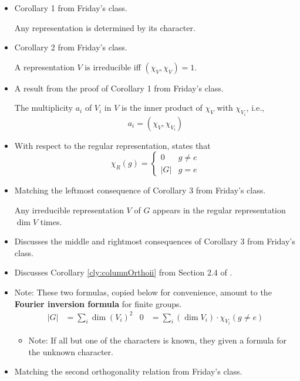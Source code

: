 \documentclass[../notes.tex]{subfiles}
\begin{document}
\begin{itemize}
\begin{FHcorollary}
\begin{proof}
\begin{align*}
            \end{align*}
            as desired.
        \end{proof}
    \end{FHcorollary}
    \item Corollary 1 from Friday's class.
    \begin{FHcorollary}
        Any representation is determined by its character.
    \end{FHcorollary}
    \item Corollary 2 from Friday's class.
    \begin{FHcorollary}
        A representation $V$ is irreducible iff $(\chi_V,\chi_V)=1$.
    \end{FHcorollary}
    \item A result from the proof of Corollary 1 from Friday's class.
    \begin{FHcorollary}
        The multiplicity $a_i$ of $V_i$ in $V$ is the inner product of $\chi_V$ with $\chi_{V_i}$, i.e.,
        \begin{equation*}
            a_i = (\chi_V,\chi_{V_i})
        \end{equation*}
    \end{FHcorollary}
    \item With respect to the regular representation, \textcite{bib:FultonHarris} states that
    \begin{equation*}
        \chi_R(g) =
        \begin{cases}
            0 & g\neq e\\
            |G| & g=e
        \end{cases}
    \end{equation*}
    \item Matching the leftmost consequence of Corollary 3 from Friday's class.
    \begin{FHcorollary}
        Any irreducible representation $V$ of $G$ appears in the regular representation $\dim V$ times.
    \end{FHcorollary}
    \item Discusses the middle and rightmost consequences of Corollary 3 from Friday's class.
    \item Discusses Corollary \ref{cly:columnOrthoii} from Section 2.4 of \textcite{bib:Serre}.
    \item Note: These two formulas, copied below for convenience, amount to the \textbf{Fourier inversion formula} for finite groups.
    \begin{align*}
        |G| &= \sum_i\dim(V_i)^2&
        0 &= \sum_i(\dim V_i)\cdot\chi_{V_i}(g\neq e)
    \end{align*}
    \begin{itemize}
        \item Note: If all but one of the characters is known, they given a formula for the unknown character.
    \end{itemize}
    \item Matching the second orthogonality relation from Friday's class.
\end{itemize}
\end{document}
